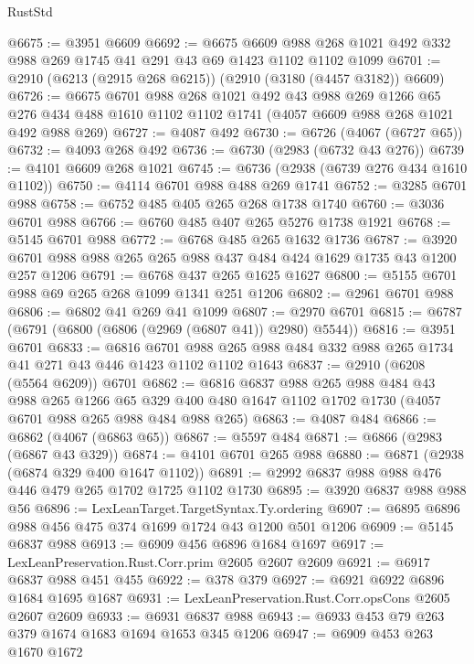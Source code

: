 \begin{lexlean}{RustStd}
\begin{coremodule}
@6675 := @3951 @6609
@6692 := @6675
    @6609
    @988
    @268
    @1021
    @492
    @332
    @988
    @269
    @1745
    @41
    @291
    @43
    @69
    @1423
    @1102
    @1102
    @1099
@6701 := @2910 (@6213 (@2915 @268 @6215)) (@2910 (@3180 (@4457 @3182)) @6609)
@6726 := @6675
    @6701
    @988
    @268
    @1021
    @492
    @43
    @988
    @269
    @1266
    @65
    @276
    @434
    @488
    @1610
    @1102
    @1102
    @1741
    (@4057 @6609 @988 @268 @1021 @492 @988 @269)
@6727 := @4087 @492
@6730 := @6726 (@4067 (@6727 @65))
@6732 := @4093 @268 @492
@6736 := @6730 (@2983 (@6732 @43 @276))
@6739 := @4101 @6609 @268 @1021
@6745 := @6736 (@2938 (@6739 @276 @434 @1610 @1102))
@6750 := @4114 @6701 @988 @488 @269 @1741
@6752 := @3285 @6701 @988
@6758 := @6752 @485 @405 @265 @268 @1738 @1740
@6760 := @3036 @6701 @988
@6766 := @6760 @485 @407 @265 @5276 @1738 @1921
@6768 := @5145 @6701 @988
@6772 := @6768 @485 @265 @1632 @1736
@6787 := @3920 @6701 @988 @988 @265 @265 @988 @437 @484 @424 @1629 @1735 @43 @1200 @257 @1206
@6791 := @6768 @437 @265 @1625 @1627
@6800 := @5155 @6701 @988 @69 @265 @268 @1099 @1341 @251 @1206
@6802 := @2961 @6701 @988
@6806 := @6802 @41 @269 @41 @1099
@6807 := @2970 @6701
@6815 := @6787 (@6791 (@6800 (@6806 (@2969 (@6807 @41)) @2980) @5544))
@6816 := @3951 @6701
@6833 := @6816
    @6701
    @988
    @265
    @988
    @484
    @332
    @988
    @265
    @1734
    @41
    @271
    @43
    @446
    @1423
    @1102
    @1102
    @1643
@6837 := @2910 (@6208 (@5564 @6209)) @6701
@6862 := @6816
    @6837
    @988
    @265
    @988
    @484
    @43
    @988
    @265
    @1266
    @65
    @329
    @400
    @480
    @1647
    @1102
    @1702
    @1730
    (@4057 @6701 @988 @265 @988 @484 @988 @265)
@6863 := @4087 @484
@6866 := @6862 (@4067 (@6863 @65))
@6867 := @5597 @484
@6871 := @6866 (@2983 (@6867 @43 @329))
@6874 := @4101 @6701 @265 @988
@6880 := @6871 (@2938 (@6874 @329 @400 @1647 @1102))
@6891 := @2992 @6837 @988 @988 @476 @446 @479 @265 @1702 @1725 @1102 @1730
@6895 := @3920 @6837 @988 @988 @56
@6896 := LexLeanTarget.TargetSyntax.Ty.ordering
@6907 := @6895 @6896 @988 @456 @475 @374 @1699 @1724 @43 @1200 @501 @1206
@6909 := @5145 @6837 @988
@6913 := @6909 @456 @6896 @1684 @1697
@6917 := LexLeanPreservation.Rust.Corr.prim @2605 @2607 @2609
@6921 := @6917 @6837 @988 @451 @455
@6922 := @378 @379
@6927 := @6921 @6922 @6896 @1684 @1695 @1687
@6931 := LexLeanPreservation.Rust.Corr.opsCons @2605 @2607 @2609
@6933 := @6931 @6837 @988
@6943 := @6933 @453 @79 @263 @379 @1674 @1683 @1694 @1653 @345 @1206
@6947 := @6909 @453 @263 @1670 @1672

\end{coremodule}
\end{lexlean}
